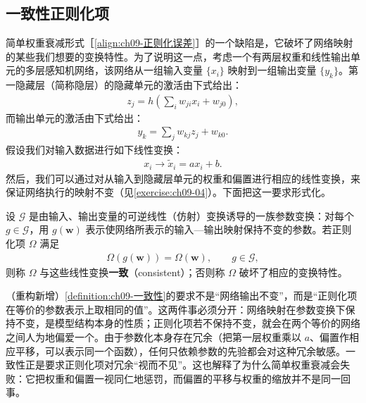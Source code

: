 \documentclass[../../main.tex]{subfiles}
\begin{document}
\subsection{一致性正则化项}\label{subsection:ch09-一致性正则化}

简单权重衰减形式［\eqref{align:ch09-正则化误差}］的一个缺陷是，它破坏了网络映射的某些我们想要的变换特性。为了说明这一点，考虑一个有两层权重和线性输出单元的多层感知机网络，该网络从一组输入变量 $\{x_{i}\}$ 映射到一组输出变量 $\{y_{k}\}$。第一隐藏层（简称隐层）的隐藏单元的激活由下式给出：
\begin{align}
z_{j}=h\!\left(\sum_{i}w_{ji}x_{i}+w_{j0}\right),
\label{align:ch09-隐层激活}
\end{align}
而输出单元的激活由下式给出：
\begin{align}
y_{k}=\sum_{j}w_{kj}z_{j}+w_{k0}.
\label{align:ch09-输出激活}
\end{align}
假设我们对输入数据进行如下线性变换：
\begin{align}
x_{i}\longrightarrow\tilde{x}_{i}=ax_{i}+b.
\label{align:ch09-输入线性变换}
\end{align}
然后，我们可以通过对从输入到隐藏层单元的权重和偏置进行相应的线性变换，来保证网络执行的映射不变（见\cref{exercise:ch09-04}）。下面把这一要求形式化。

\begin{definition}[线性变换一致性]\label{definition:ch09-一致性}
设 $\mathcal{G}$ 是由输入、输出变量的可逆线性（仿射）变换诱导的一族参数变换：对每个 $g\in\mathcal{G}$，用 $g(\boldsymbol{w})$ 表示使网络所表示的输入—输出映射保持不变的参数。若正则化项 $\Omega$ 满足
\begin{align*}
\Omega(g(\boldsymbol{w}))=\Omega(\boldsymbol{w}),\qquad g\in\mathcal{G},
\end{align*}
则称 $\Omega$ 与这些线性变换\textbf{一致}（consistent）；否则称 $\Omega$ 破坏了相应的变换特性。
\end{definition}

\begin{remark}（重构新增）\cref{definition:ch09-一致性}的要求不是“网络输出不变”，而是“正则化项在等价的参数表示上取相同的值”。这两件事必须分开：网络映射在参数变换下保持不变，是模型结构本身的性质；正则化项若不保持不变，就会在两个等价的网络之间人为地偏爱一个。由于参数化本身存在冗余（把第一层权重乘以 $a$、偏置作相应平移，可以表示同一个函数），任何只依赖参数的先验都会对这种冗余敏感。一致性正是要求正则化项对冗余“视而不见”。这也解释了为什么简单权重衰减会失败：它把权重和偏置一视同仁地惩罚，而偏置的平移与权重的缩放并不是同一回事。
\end{remark}
\end{document}
